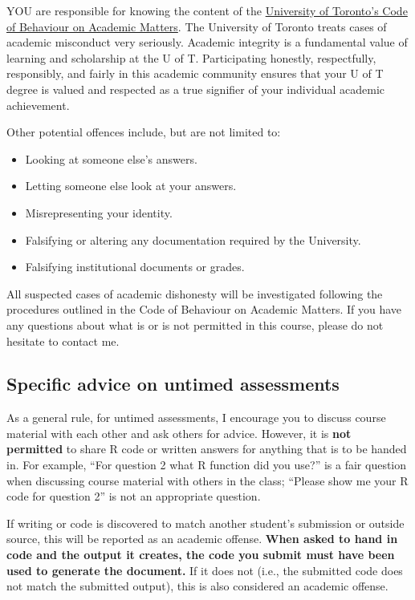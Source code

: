 \documentclass[
  openany]{book}
\begin{document}
YOU are responsible for knowing the content of the \href{http://www.governingcouncil.utoronto.ca/policies/behaveac.htm}{University of Toronto's Code of Behaviour on Academic Matters}. The University of Toronto treats cases of academic misconduct very seriously. Academic integrity is a fundamental value of learning and scholarship at the U of T. Participating honestly, respectfully, responsibly, and fairly in this academic community ensures that your U of T degree is valued and respected as a true signifier of your individual academic achievement.

Other potential offences include, but are not limited to:

\begin{itemize}
\item
  Looking at someone else's answers.
\item
  Letting someone else look at your answers.
\item
  Misrepresenting your identity.
\item
  Falsifying or altering any documentation required by the University.
\item
  Falsifying institutional documents or grades.
\end{itemize}

All suspected cases of academic dishonesty will be investigated following the procedures outlined in the Code of Behaviour on Academic Matters. If you have any questions about what is or is not permitted in this course, please do not hesitate to contact me.

\hypertarget{specific-advice-on-untimed-assessments}{%
\subsection{Specific advice on untimed assessments}\label{specific-advice-on-untimed-assessments}}

As a general rule, for untimed assessments, I encourage you to discuss course material with each other and ask others for advice. However, it is \textbf{not permitted} to share R code or written answers for anything that is to be handed in. For example, ``For question 2 what R function did you use?'' is a fair question when discussing course material with others in the class; ``Please show me your R code for question 2'' is not an appropriate question.

If writing or code is discovered to match another student's submission or outside source, this will be reported as an academic offense. \textbf{When asked to hand in code and the output it creates, the code you submit must have been used to generate the document.} If it does not (i.e., the submitted code does not match the submitted output), this is also considered an academic offense.
\end{document}
